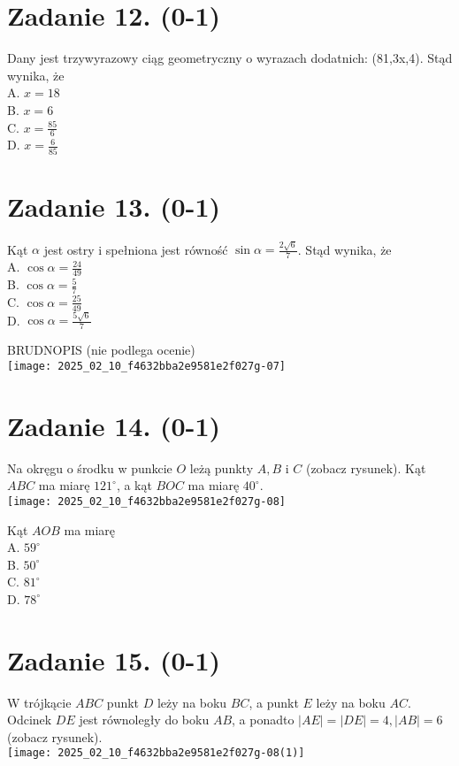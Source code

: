 \documentclass[10pt]{article}
\begin{document}
\section*{Zadanie 12. (0-1)}
Dany jest trzywyrazowy ciąg geometryczny o wyrazach dodatnich: (81,3x,4). Stąd wynika, że\\
A. \(x=18\)\\
B. \(x=6\)\\
C. \(x=\frac{85}{6}\)\\
D. \(x=\frac{6}{85}\)

\section*{Zadanie 13. (0-1)}
Kąt \(\alpha\) jest ostry i spełniona jest równość \(\sin \alpha=\frac{2 \sqrt{6}}{7}\). Stąd wynika, że\\
A. \(\cos \alpha=\frac{24}{49}\)\\
B. \(\cos \alpha=\frac{5}{7}\)\\
C. \(\cos \alpha=\frac{25}{49}\)\\
D. \(\cos \alpha=\frac{5 \sqrt{6}}{7}\)

BRUDNOPIS (nie podlega ocenie)\\
\texttt{[image: 2025\_02\_10\_f4632bba2e9581e2f027g-07]}

\section*{Zadanie 14. (0-1)}
Na okręgu o środku w punkcie \(O\) leżą punkty \(A, B\) i \(C\) (zobacz rysunek). Kąt \(A B C\) ma miarę \(121^{\circ}\), a kąt \(B O C\) ma miarę \(40^{\circ}\).\\
\texttt{[image: 2025\_02\_10\_f4632bba2e9581e2f027g-08]}

Kąt \(A O B\) ma miarę\\
A. \(59^{\circ}\)\\
B. \(50^{\circ}\)\\
C. \(81^{\circ}\)\\
D. \(78^{\circ}\)

\section*{Zadanie 15. (0-1)}
W trójkącie \(A B C\) punkt \(D\) leży na boku \(B C\), a punkt \(E\) leży na boku \(A C\). Odcinek \(D E\) jest równoległy do boku \(A B\), a ponadto \(|A E|=|D E|=4,|A B|=6\) (zobacz rysunek).\\
\texttt{[image: 2025\_02\_10\_f4632bba2e9581e2f027g-08(1)]}
\end{document}
